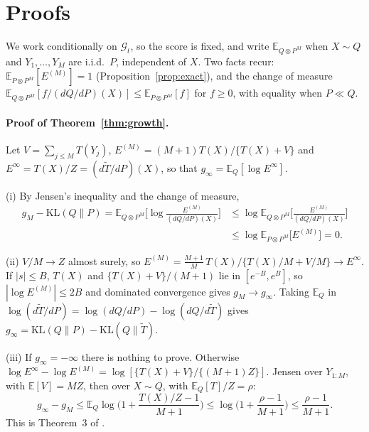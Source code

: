 \documentclass[12pt]{article}
\newcommand{\E}{\mathbb{E}}
\newcommand{\KL}{\mathrm{KL}}
\newcommand{\G}{\mathcal{G}}
\theoremstyle{remark}
\begin{document}
\section{Proofs}\label{app:proofs}

We work conditionally on $\G_t$, so the score is fixed, and write
$\E_{Q\otimes P^M}$ when $X \sim Q$ and $Y_1, \ldots, Y_M$ are i.i.d.\ $P$,
independent of $X$. Two facts recur: $\E_{P\otimes P^M}[E^{(M)}] = 1$
(Proposition~\ref{prop:exact}), and the change of measure
$\E_{Q\otimes P^M}[f/(dQ/dP)(X)] \le \E_{P\otimes P^M}[f]$ for $f \ge 0$, with
equality when $P \ll Q$.

\paragraph{Proof of Theorem~\ref{thm:growth}.}
Let $V = \sum_{j \le M} T(Y_j)$, $E^{(M)} = (M+1)T(X)/\{T(X)+V\}$ and
$E^\infty = T(X)/Z = (d\tilde T/dP)(X)$, so that $g_\infty = \E_Q[\log E^\infty]$.

(i) By Jensen's inequality and the change of measure,
\[
\begin{aligned}
g_M - \KL(Q\|P) = \E_{Q \otimes P^M}\Big[\log\frac{E^{(M)}}{(dQ/dP)(X)}\Big]
&\le \log \E_{Q \otimes P^M}\Big[\frac{E^{(M)}}{(dQ/dP)(X)}\Big] \\
&\le \log \E_{P \otimes P^M}\big[E^{(M)}\big] = 0 .
\end{aligned}
\]

(ii) $V/M \to Z$ almost surely, so
$E^{(M)} = \frac{M+1}{M}\,T(X)/\{T(X)/M + V/M\} \to E^\infty$. If $|s| \le B$,
$T(X)$ and $\{T(X)+V\}/(M+1)$ lie in $[e^{-B}, e^{B}]$, so
$|\log E^{(M)}| \le 2B$ and dominated convergence gives $g_M \to g_\infty$.
Taking $\E_Q$ in $\log(d\tilde T/dP) = \log(dQ/dP) - \log(dQ/d\tilde T)$ gives
$g_\infty = \KL(Q\|P) - \KL(Q\|\tilde T)$.

(iii) If $g_\infty = -\infty$ there is nothing to prove. Otherwise
$\log E^\infty - \log E^{(M)} = \log[\{T(X) + V\}/\{(M+1)Z\}]$. Jensen over
$Y_{1:M}$, with $\E[V] = MZ$, then over $X \sim Q$, with $\E_Q[T]/Z = \rho$:
\[
g_\infty - g_M \le \E_Q\log\Big(1 + \frac{T(X)/Z - 1}{M+1}\Big)
\le \log\Big(1 + \frac{\rho - 1}{M+1}\Big) \le \frac{\rho-1}{M+1}.
\]
This is Theorem~3 of \citet{dombowsky2026besag}.
\end{document}
